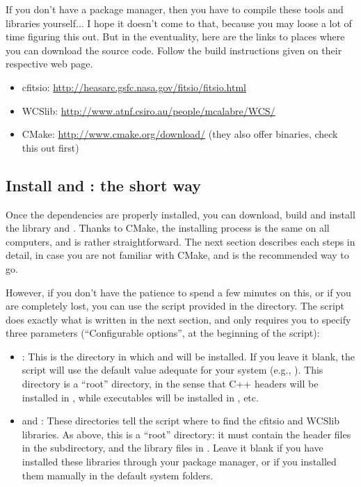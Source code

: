 If you don't have a package manager, then you have to compile these tools and libraries yourself... I hope it doesn't come to that, because you may loose a lot of time figuring this out. But in the eventuality, here are the links to places where you can download the source code. Follow the build instructions given on their respective web page.
\begin{itemize}
\item cfitsio: \url{http://heasarc.gsfc.nasa.gov/fitsio/fitsio.html}
\item WCSlib: \url{http://www.atnf.csiro.au/people/mcalabre/WCS/}
\item CMake: \url{http://www.cmake.org/download/} (they also offer binaries, check this out first)
\end{itemize}

\subsection{Install \phypp and \egg: the short way}

Once the dependencies are properly installed, you can download, build and install the \phypp library and \egg. Thanks to CMake, the installing process is the same on all computers, and is rather straightforward. The next section describes each steps in detail, in case you are not familiar with CMake, and is the recommended way to go.

However, if you don't have the patience to spend a few minutes on this, or if you are completely lost, you can use the  script provided in the  directory. The script does exactly what is written in the next section, and only requires you to specify three parameters (``Configurable options'', at the beginning of the script):
\begin{itemize}
\item {}: This is the directory in which \phypp and \egg will be installed. If you leave it blank, the script will use the default value adequate for your system (e.g., ). This directory is a ``root'' directory, in the sense that C++ headers will be installed in , while executables will be installed in , etc.
\item {} and : These directories tell the script where to find the cfitsio and WCSlib libraries. As above, this is a ``root'' directory: it must contain the header files in the  subdirectory, and the library files in . Leave it blank if you have installed these libraries through your package manager, or if you installed them manually in the default system folders.
\end{itemize}

